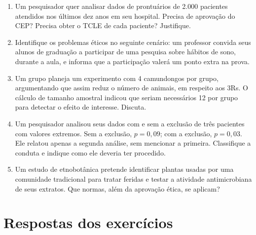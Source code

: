 \documentclass[
]{book}
\begin{document}
\begin{enumerate}
\def\labelenumi{\arabic{enumi}.}
\item
  Um pesquisador quer analisar dados de prontuários de 2.000 pacientes atendidos nos últimos dez anos em seu hospital. Precisa de aprovação do CEP? Precisa obter o TCLE de cada paciente? Justifique.
\item
  Identifique os problemas éticos no seguinte cenário: um professor convida seus alunos de graduação a participar de uma pesquisa sobre hábitos de sono, durante a aula, e informa que a participação valerá um ponto extra na prova.
\item
  Um grupo planeja um experimento com 4 camundongos por grupo, argumentando que assim reduz o número de animais, em respeito aos 3Rs. O cálculo de tamanho amostral indicou que seriam necessários 12 por grupo para detectar o efeito de interesse. Discuta.
\item
  Um pesquisador analisou seus dados com e sem a exclusão de três pacientes com valores extremos. Sem a exclusão, \(p = 0{,}09\); com a exclusão, \(p = 0{,}03\). Ele relatou apenas a segunda análise, sem mencionar a primeira. Classifique a conduta e indique como ele deveria ter procedido.
\item
  Um estudo de etnobotânica pretende identificar plantas usadas por uma comunidade tradicional para tratar feridas e testar a atividade antimicrobiana de seus extratos. Que normas, além da aprovação ética, se aplicam?
\end{enumerate}

\section{Respostas dos exercícios}\label{respostas-dos-exercuxedcios-7}
\end{document}
